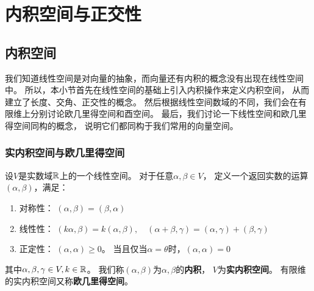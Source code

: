 \chapter{内积空间与正交性}

\section{内积空间}
我们知道线性空间是对向量的抽象，而向量还有内积的概念没有出现在线性空间中。
所以，本小节首先在线性空间的基础上引入内积操作来定义内积空间，
从而建立了长度、交角、正交性的概念。
然后根据线性空间数域的不同，我们会在有限维上分别讨论欧几里得空间和酉空间。
最后，我们讨论一下线性空间和欧几里得空间同构的概念，
说明它们都同构于我们常用的向量空间。

\subsection{实内积空间与欧几里得空间}
\begin{definition}[实内积空间与欧几里得空间]
  设$V$是实数域$\mathbb{R}$上的一个线性空间。
  对于任意$\alpha,\beta\in V$，
  定义一个返回实数的运算$(\alpha,\beta)$，满足：
  \begin{enumerate}
    \item 对称性：
    $(\alpha,\beta)=(\beta,\alpha)$
    \item 线性性：
    $(k\alpha,\beta)=k(\alpha,\beta),\quad
      (\alpha+\beta,\gamma)=(\alpha,\gamma)+(\beta,\gamma)$
    \item 正定性：
    $(\alpha,\alpha)\ge 0$。
    当且仅当$\alpha=\theta$时，$(\alpha,\alpha)=0$
  \end{enumerate}
  其中$\alpha,\beta,\gamma\in V, k\in\mathbb{R}$。
  我们称$(\alpha,\beta)$为$\alpha,\beta$的\textbf{内积}，
  $V$为\textbf{实内积空间}。
  有限维的实内积空间又称\textbf{欧几里得空间}。
\end{definition}

